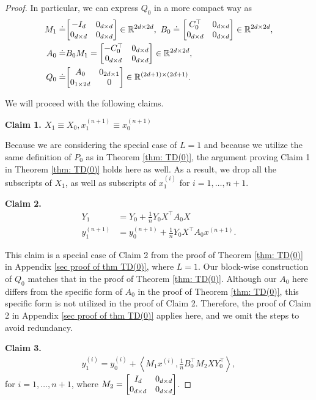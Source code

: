 \documentclass{article}
\newcommand{\R}{\mathbb{R}}
\newcommand{\indot}[2]{{\left<#1, #2\right>}}
\begin{document}
\begin{proof}
    In particular,
    we can express $Q_0$ in a more compact way as
\begin{align}
  M_1 \doteq& \mqty[-I_{d} &  0_{d \times d} \\0_{d \times d} & 0_{d \times d}] \in \R^{2d \times 2d}, \label{eq: L1 M_1 define} \
  B_0 \doteq \mqty[C_0^\top & 0_{d\times d} \\ 0_{d \times d} & 0_{d \times d}] \in \R^{2d \times 2d},\\
  A_0 \doteq& B_0M_1  = \mqty[-C_0^\top &  0_{d \times d}\\ 0_{d \times d} & 0_{d \times d}] \in \R^{2d \times 2d},\\
  Q_0 \doteq& \mqty[A_0 & 0_{2d \times 1} \\ 0_{1 \times 2d} & 0] \in \R^{(2d + 1) \times (2d+1)}.
\end{align}

We will proceed with the following claims.

    \textbf{Claim 1. $X_1 \equiv X_0 , x_1^{(n+1)} \equiv x_0^{(n+1)}$}
    
    Because we are considering the special case of $L=1$ and because we utilize the same definition of $P_0$ as in Theorem \ref{thm: TD(0)}, the argument proving Claim 1 in Theorem \ref{thm: TD(0)} holds here as well. As a result,
    we drop all the subscripts of $X_1$,
    as well as subscripts of $x_1^{(i)}$ for $i=1,\dots, n+1$. 

    \textbf{Claim 2.}
    \begin{align}
        Y_{1} &= Y_0 + \frac{1}{n} Y_0 X^\top A_0 X\\
        y_{1}^{(n+1)} &= y_0^{(n+1)} + \frac{1}{n} Y_0 X^\top A_0 x^{(n+1)}.
    \end{align}

This claim is a special case of Claim 2 from the proof of Theorem \ref{thm: TD(0)} in Appendix \ref{sec proof of thm TD(0)}, where $L = 1 $. Our block-wise construction of $Q_0$ matches that in the proof of Theorem \ref{thm: TD(0)}. Although our $A_0$ here differs from the specific form of $A_0$ in the proof of Theorem \ref{thm: TD(0)}, this specific form is not utilized in the proof of Claim 2. Therefore, the proof of Claim 2 in Appendix \ref{sec proof of thm TD(0)} applies here, and we omit the steps to avoid redundancy.

    \textbf{Claim 3.}
    \begin{align}
      y_{1}^{(i)} = y_0^{(i)} + \indot{M_1 x^{(i)}}{ \frac{1}{n} B_0^\top M_2 X Y_0^\top},
    \end{align}
    for $i = 1, \dots, n+1$, where $M_2 = \mqty[I_{d} & 0_{d\times d}\\ 0_{d\times d} & 0_{d\times d}]$.
    

\end{proof}
\end{document}
